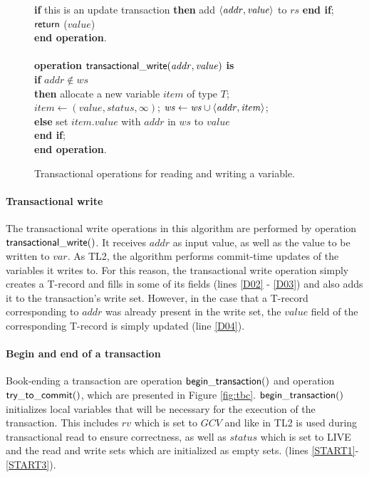 \documentclass[11pt,letterpaper]{article}
\begin{document}
\begin{figure}
{{\begin{minipage}[t]{150mm}
\begin{tabbing}
 \> {\bf if} this is an update transaction 
                        {\bf then} add $\left \langle \mathit{addr,value} \right \rangle $ to $\mathit{rs}$ {\bf end if}; \\
 \> ${\sf return}$ ($\mathit{value}$) \\
{\bf end operation}. \\
\\
{\bf operation}  ${\sf transactional\_write}(\mathit{addr, value})$ {\bf is}\\
 \> {\bf if} $\mathit{addr} \not\in \mathit{ws}$  \\
 \>\> {\bf then} \> allocate a new variable $item$ of type $T$; \\
 \>\>\> $\mathit{item}  \gets (\mathit{value, status, \infty})$; 
                   $\mathit{ws} \gets \mathit{ws} \cup \left \langle \mathit{addr, item} \right \rangle $; \\
 \>\> {\bf else} \> set $\mathit{item.value}$ with $\mathit{addr}$ in $\mathit{ws}$ to $\mathit{value}$ \\
 \> {\bf end if}; \\
{\bf end operation}.
\end{tabbing}
\normalsize
\end{minipage}
}
\caption{Transactional operations for reading and writing a variable.}
\label{fig:tops}
}
\end{figure}

\paragraph{Transactional write}
The transactional write operations in this algorithm are performed by 
operation ${\sf transactional\_write()}$. 
It receives $\mathit{addr}$ as input value, as well as the value 
to be written to $\mathit{var}$. As  TL2, the algorithm 
performs commit-time updates of the variables it writes to. 
For this reason, the transactional write  
operation simply creates a T-record and fills in some of its 
fields (lines \ref{D02} - \ref{D03}) and also 
adds it to the transaction{}'s write set.
However, in the case that a T-record corresponding to $\mathit{addr}$  was
already present in  the write set, the
$\mathit{value}$ field of the corresponding  
T-record is simply updated (line \ref{D04}).


\paragraph{Begin and end of a transaction} 
Book-ending a transaction are operation ${\sf begin\_transaction()}$ 
and operation ${\sf try\_to\_commit()}$, which are 
presented in Figure \ref{fig:tbc}. ${\sf begin\_transaction()}$ 
initializes local variables that will be necessary 
for the execution of the transaction.
This includes $\mathit{rv}$
which is set to $\mathit{GCV}$ and like in TL2 is used during transactional
read to ensure correctness, 
as well as $\mathit{status}$ which is set to LIVE and the read and write sets
which are initialized as empty sets.
(lines \ref{START1}-\ref{START3}). 
\end{document}
